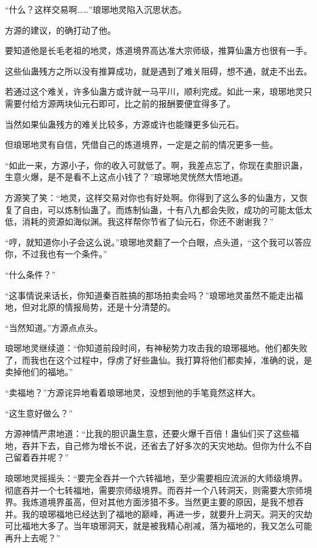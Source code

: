 \begin{this_body}
“什么？这样交易啊……”琅琊地灵陷入沉思状态。

方源的建议，的确打动了他。

要知道他是长毛老祖的地灵，炼道境界高达准大宗师级，推算仙蛊方也很有一手。

这些仙蛊残方之所以没有推算成功，就是遇到了难关阻碍，想不通，就走不出去。

若通过这个难关，许多仙蛊方或许就一马平川，顺利完成。如此一来，琅琊地灵只需要付给方源两块仙元石即可，比之前的报酬要便宜得多了。

当然如果仙蛊残方的难关比较多，方源或许也能赚更多仙元石。

但琅琊地灵有自信，凭借自己的炼道境界，一定是之前的情况更多一些。

“如此一来，方源小子，你的收入可就低了。啊，我差点忘了，你现在卖胆识蛊，生意火爆，是不是看不上这点小钱了？”琅琊地灵恍然大悟地道。

方源笑了笑：“地灵，这样交易对你也有好处啊。你得到了这么多的仙蛊方，又恢复了自由，可以炼制仙蛊了。而炼制仙蛊，十有八九都会失败，成功的可能太低太低，消耗的资源如海似渊。我这样帮你节省了仙元石，你还不谢谢我？”

“哼，就知道你小子会这么说。”琅琊地灵翻了一个白眼，点头道，“这个我可以答应你，不过我也有一个条件。”

“什么条件？”

“这事情说来话长，你知道秦百胜搞的那场拍卖会吗？”琅琊地灵虽然不能走出福地，但对北原的情报局势，还是十分清楚的。

“当然知道。”方源点点头。

琅琊地灵继续道：“你知道前段时间，有神秘势力攻击我的琅琊福地。他们都失败了，而我也在这个过程中，俘虏了好些蛊仙。我打算将他们都卖掉，准确的说，是卖掉他们的福地。”

“卖福地？”方源诧异地看着琅琊地灵，没想到他的手笔竟然这样大。

“这生意好做么？”

方源神情严肃地道：“比我的胆识蛊生意，还要火爆千百倍！蛊仙们买了这些福地，吞并下去，自己修为增长不说，还省去了好多次的天灾地劫。但你为什么不自己留着吞并呢？”

琅琊地灵摇摇头：“要完全吞并一个六转福地，至少需要相应流派的大师级境界。彻底吞并一个七转福地，需要宗师级境界。而吞并一个八转洞天，则需要大宗师境界。我炼道境界虽高，但对其他方面涉猎不多。当然更主要的原因，是我不想吞并。我的琅琊福地已经达到了福地的巅峰，再进一步，就要升上洞天。洞天的灾劫可比福地大多了。当年琅琊洞天，就是被我精心削减，落为福地的，我又怎么可能再升上去呢？”


\end{this_body}
